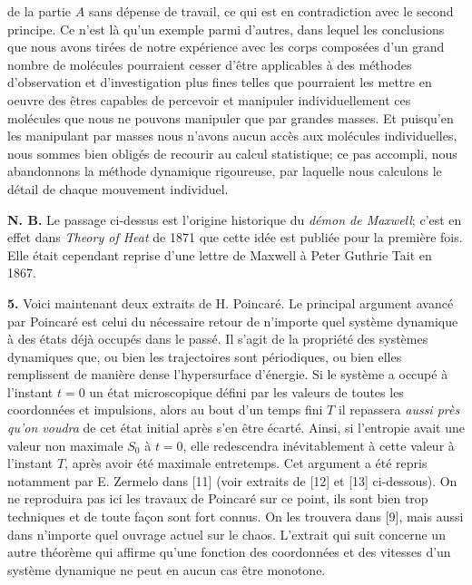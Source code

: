 {de la partie $A$ sans d\'epense de travail, ce qui est en contradiction 
avec le second principe. 
\smallskip
Ce n'est l\`a qu'un exemple parmi d'autres, dans lequel les conclusions 
que nous avons tir\'ees de notre exp\'erience avec les corps compos\'ees 
d'un grand nombre de mol\'ecules pourraient cesser d'\^etre applicables 
\`a des m\'ethodes d'observation et d'investigation plus fines telles 
que pourraient les mettre en oeuvre des \^etres capables de percevoir et
manipuler individuellement ces mol\'ecules que nous ne pouvons manipuler 
que par grandes masses. 
\smallskip
Et puisqu'en les manipulant par masses nous n'avons aucun acc\`es aux 
mol\'ecules individuelles, nous sommes bien oblig\'es de recourir au 
calcul statistique; ce pas accompli, nous abandonnons la m\'ethode 
dynamique rigoureuse, par laquelle nous calculons le d\'etail de chaque 
mouvement individuel. \par }
\medskip
{\bf N. B.} Le passage ci-dessus est l'origine historique du {\it d\'emon 
de Maxwell}; c'est en effet dans {\it Theory of Heat} de {  1871}
que cette id\'ee est publi\'ee pour la premi\`ere fois. 
Elle \'etait cependant reprise d'une lettre de Maxwell \`a Peter Guthrie 
Tait en {  1867}.

\bigskip

{\bf 5.}\hskip3mm Voici maintenant deux extraits de H. Poincar\'e. 
Le principal argument avanc\'e par Poincar\'e est celui du 
n\'ecessaire retour de n'importe quel 
syst\`eme dynamique \`a des \'etats d\'ej\`a occup\'es dans le pass\'e. 
Il s'agit de la propri\'et\'e des syst\`emes dynamiques que, ou bien les 
trajectoires sont p\'eriodiques, ou bien elles remplissent de mani\`ere 
dense l'hypersurface d'\'energie. Si le syst\`eme a occup\'e \`a l'instant 
$t=0$ un \'etat microscopique d\'efini 
par les valeurs de toutes les coordonn\'ees et impulsions, alors au bout 
d'un temps fini $T$ il repassera {\it aussi pr\`es qu'on voudra} de cet 
\'etat initial apr\`es s'en \^etre \'ecart\'e. Ainsi, si l'entropie 
avait une valeur non maximale $S_0$ \`a $t=0$, elle redescendra 
in\'evitablement \`a cette valeur \`a l'instant $T$, apr\`es avoir 
\'et\'e maximale entretemps. Cet argument a \'et\'e repris notamment par 
E. Zermelo dans [11] (voir extraits de [12] et [13] ci-dessous). On ne
reproduira 
pas ici les travaux de Poincar\'e sur ce point, ils sont bien trop 
techniques et de toute fa\c{c}on sont fort connus. On les trouvera 
dans [9], mais aussi dans n'importe quel ouvrage actuel sur le chaos.
\medskip
L'extrait qui suit concerne un autre th\'eor\`eme qui affirme qu'une 
fonction des coordonn\'ees et des vitesses d'un syst\`eme dynamique 
ne peut en aucun cas \^etre monotone. 

